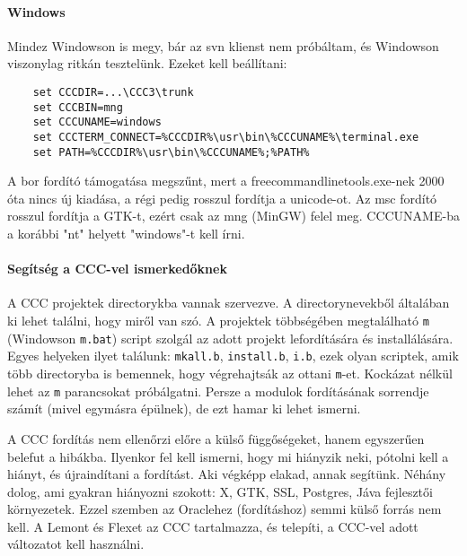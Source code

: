 \paragraph{Windows}

Mindez Windowson is megy, bár az svn klienst nem próbáltam,
és Windowson viszonylag ritkán tesztelünk. Ezeket kell beállítani:
\begin{verbatim}
    set CCCDIR=...\CCC3\trunk
    set CCCBIN=mng
    set CCCUNAME=windows
    set CCCTERM_CONNECT=%CCCDIR%\usr\bin\%CCCUNAME%\terminal.exe
    set PATH=%CCCDIR%\usr\bin\%CCCUNAME%;%PATH%
\end{verbatim}
A bor fordító támogatása megszűnt, 
mert a freecommandlinetools.exe-nek 2000 óta nincs új kiadása, 
a régi pedig rosszul fordítja a unicode-ot. 
Az msc fordító rosszul fordítja a GTK-t, 
ezért csak az mng (MinGW) felel meg. 
CCCUNAME-ba a korábbi "nt" helyett "windows"-t kell írni.


\paragraph{Segítség a CCC-vel ismerkedőknek}

A CCC projektek directorykba vannak
szervezve. A directorynevekből általában ki lehet találni,
hogy miről van szó. A projektek többségében megtalálható \verb!m!
(Windowson \verb!m.bat!) script szolgál az adott projekt
lefordítására és installálására. Egyes helyeken ilyet találunk: 
\verb!mkall.b!, \verb!install.b!, \verb!i.b!, 
ezek olyan   scriptek, amik több directoryba is bemennek, 
hogy végrehajtsák   az ottani \verb!m!-et. Kockázat nélkül 
lehet az \verb!m! parancsokat próbálgatni. Persze a modulok 
fordításának  sorrendje számít (mivel egymásra épülnek),
de ezt hamar ki lehet ismerni.
  
A CCC fordítás nem ellenőrzi előre a külső függőségeket,
hanem egyszerűen belefut a hibákba. Ilyenkor fel kell ismerni,
hogy mi hiányzik neki, pótolni kell a hiányt, és újraindítani
a fordítást. Aki végképp elakad, annak segítünk. 
Néhány dolog, ami gyakran hiányozni szokott: 
X, GTK, SSL, Postgres, Jáva fejlesztői környezetek.
Ezzel szemben az Oraclehez (fordításhoz) semmi külső forrás nem kell.
A Lemont és Flexet az CCC tartalmazza, és telepíti,
a CCC-vel adott változatot kell használni.

 